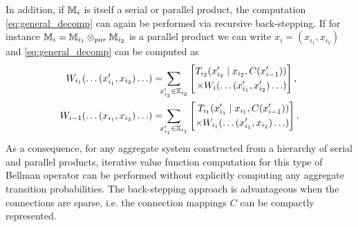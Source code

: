 \documentclass[conference]{IEEEtran}
\begin{document}
In addition, if $\mathbb{M}_{i}$ is itself a serial or parallel product, the computation \eqref{eq:general_decomp} can again be performed via recursive back-stepping. If for instance $\mathbb{M}_{i} = \mathbb{M}_{i_1} \otimes_{par} \mathbb{M}_{i_2}$ is a parallel product we can write $x_i = (x_{i_1}, x_{i_2})$ and \eqref{eq:general_decomp} can be computed as
\begin{equation*}
\begin{aligned}
  W_{i_1}(\ldots (x_{i_1}', x_{i_2}) \ldots) & = \hspace{-2mm} \sum_{x_{i_2}'  \in \X_{i_2}} \left[ \begin{aligned} T_{i_2}(x_{i_2}' \mid x_{i_2}, C(x_{i-1}') ) \\ \times W_i(\ldots (x_{i_1}', x_{i_2}') \ldots) \end{aligned} \right], \\
  W_{i-1}(\ldots (x_{i_1}, x_{i_2}) \ldots)  & =  \hspace{-2mm} \sum_{x_{i_1}' \in \X_{i_1}} \left[ \begin{aligned} T_{i_1}(x_{i_1}' \mid x_{i_1}, C(x_{i-1}') ) \\
  	\times W_{i_1}(\ldots (x_{i_1}', x_{i_2}) \ldots)	
  \end{aligned} \right].
\end{aligned}
\end{equation*}
As a consequence, for any aggregate system constructed from a hierarchy of serial and parallel products, iterative value function computation for this type of Bellman operator can be performed without explicitly computing any aggregate transition probabilities. The back-stepping approach is advantageous when the connections are sparse, i.e. the connection mappings $C$ can be compactly represented.
\end{document}

